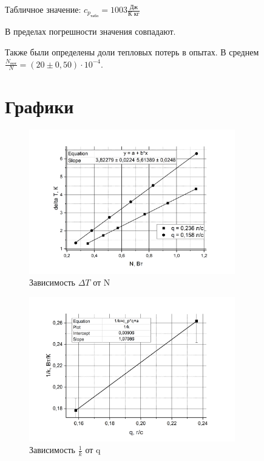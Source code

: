 \documentclass[a4paper,12pt]{article} %
\begin{document}
\noindent Табличное значение: $ c_{p_\text{табл}} = 1003 \frac{ \text{Дж}}{\text{К кг}}$

\medskip

\noindent В пределах погрешности значения совпадают.

\medskip

\noindent Также были определены доли тепловых потерь в опытах. В среднем $\frac{N_\text{пот}}{N} = (20 \pm 0,50) \cdot 10^{-4}.$


\section{Графики}	

\begin{figure}[h!]
	\begin{center}
		\includegraphics[width = 0.8\textwidth]{1.png}
	\end{center}
	\caption{Зависимость $\Delta T$ от N}
\end{figure}

\newpage


\begin{figure}[h!]
	\begin{center}
		\includegraphics[width = 0.8\textwidth]{2.png}
	\end{center}
	\caption{Зависимость $\frac{1}{k}$ от q}
\end{figure}
\end{document}
